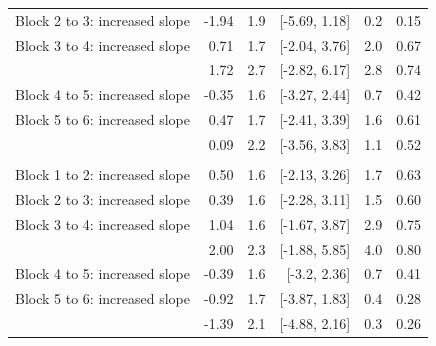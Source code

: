 \documentclass[
  11pt,
  man,mask,floatsintext]{apa6}
\begin{document}
\begin{table}[H]
\begin{tabular}[t]{>{\raggedright\arraybackslash}p{15em}rrrrr}
\hspace{1em}Block 2 to 3: increased slope & -1.94 & 1.9 & {}[-5.69, 1.18] & 0.2 & 0.15\\
\hspace{1em}Block 3 to 4: increased slope & 0.71 & 1.7 & {}[-2.04, 3.76] & 2.0 & 0.67\\
\hspace{1em}{\em Block 1 to 4: increased slope} & 1.72 & 2.7 & {}[-2.82, 6.17] & 2.8 & 0.74\\
\hspace{1em}Block 4 to 5: increased slope & -0.35 & 1.6 & {}[-3.27, 2.44] & 0.7 & 0.42\\
\hspace{1em}Block 5 to 6: increased slope & 0.47 & 1.7 & {}[-2.41, 3.39] & 1.6 & 0.61\\
\hspace{1em}{\em Block 4 to 6: increased slope} & 0.09 & 2.2 & {}[-3.56, 3.83] & 1.1 & 0.52\\
\addlinespace[0.3em]
\multicolumn{6}{l}{\textbf{Difference between blocks: +40}}\\
\hspace{1em}Block 1 to 2: increased slope & 0.50 & 1.6 & {}[-2.13, 3.26] & 1.7 & 0.63\\
\hspace{1em}Block 2 to 3: increased slope & 0.39 & 1.6 & {}[-2.28, 3.11] & 1.5 & 0.60\\
\hspace{1em}Block 3 to 4: increased slope & 1.04 & 1.6 & {}[-1.67, 3.87] & 2.9 & 0.75\\
\hspace{1em}{\em Block 1 to 4: increased slope} & 2.00 & 2.3 & {}[-1.88, 5.85] & 4.0 & 0.80\\
\hspace{1em}Block 4 to 5: increased slope & -0.39 & 1.6 & {}[-3.2, 2.36] & 0.7 & 0.41\\
\hspace{1em}Block 5 to 6: increased slope & -0.92 & 1.7 & {}[-3.87, 1.83] & 0.4 & 0.28\\
\hspace{1em}{\em Block 4 to 6: increased slope} & -1.39 & 2.1 & {}[-4.88, 2.16] & 0.3 & 0.26\\
\bottomrule
\end{tabular}
\end{table}
\end{document}
